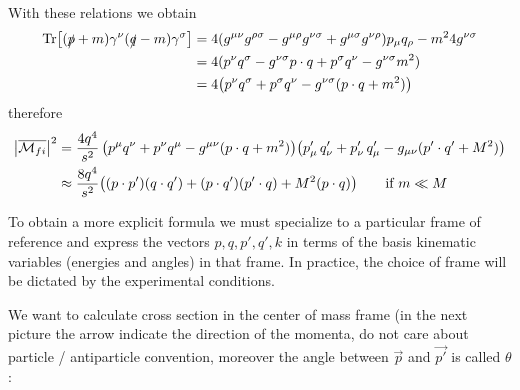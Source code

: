 \documentclass[TheoreticalPhy_ModB.tex]{subfiles}
\begin{document}
\begin{enumerate}[label=(\Roman*)]
\end{enumerate}

With these relations we obtain
	\begin{align*}
	\Tr[(\slashed p + m) \gamma^{\nu}(\slashed q - m) \gamma^{\sigma}]
	& = 4(g^{\mu\nu}g^{\rho\sigma} - g^{\mu\rho}g^{\nu\sigma} + g^{\mu\sigma}g^{\nu\rho}) p_{\mu}q_{\rho} - m^2 4g^{\nu\sigma} \\
	& = 4 (p^{\nu}q^{\sigma} - g^{\nu\sigma}p \cdot q + p^{\sigma}q^{\nu} - g^{\nu\sigma}m^2) \\
	& = 4 \bigl(p^{\nu}q^{\sigma} + p^{\sigma}q^{\nu} - g^{\nu\sigma}(p \cdot q + m^2) \bigr)
	\end{align*}
therefore
	\begin{align*}
	\abs{\overline{\mathcal{M}_{fi}}}^2 
	& = \frac{4q^4}{s^2} \, \bigl( p^{\mu}q^{\nu} + p^{\nu}q^{\mu} - g^{\mu\nu}(p \cdot q + m^2) \bigr)
		\bigl( p'_{\mu}\, q'_{\nu} + p'_{\nu}\, q'_{\mu} - g_{\mu\nu} (p' \cdot q' + M^2) \bigr) \\
	& \approx \frac{8q^4}{s^2} \bigl( (p \cdot p')(q \cdot q') + (p \cdot q')(p' \cdot q) + M^2(p \cdot q) \bigr)
		\qquad \textup{if } m \ll M
	\end{align*}

To obtain a more explicit formula we must specialize to a particular frame of reference and express the vectors $p, q, p', q', k$ in terms of the basis kinematic variables (energies and angles) in that frame. In practice, the choice of frame will be dictated by the experimental conditions.

We want to calculate cross section in the center of mass frame (in the next picture the arrow indicate the direction of the momenta, do not care about particle / antiparticle convention, moreover the angle between $\vec p$ and $\vec {p'}$ is called $\theta$:
\end{document}
